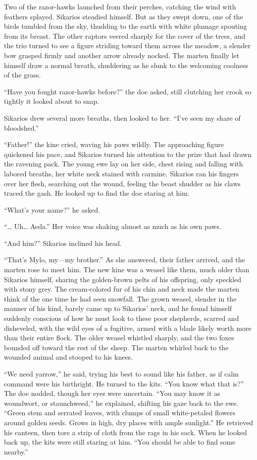 Two of the razor-hawks launched from their perches, catching the wind with feathers splayed. Sikarios steadied himself. But as they swept down, one of the birds tumbled from the sky, thudding to the earth with white plumage spouting from its breast. The other raptors veered sharply for the cover of the trees, and the trio turned to see a figure striding toward them across the meadow, a slender bow grasped firmly and another arrow already nocked. The marten finally let himself draw a normal breath, shuddering as he slunk to the welcoming coolness of the grass.

``Have you fought razor-hawks before?'' the doe asked, still clutching her crook so tightly it looked about to snap.

Sikarios drew several more breaths, then looked to her. ``I've seen my share of bloodshed.''

``Father!'' the kine cried, waving his paws wildly. The approaching figure quickened his pace, and Sikarios turned his attention to the prize that had drawn the ravening pack. The young ewe lay on her side, chest rising and falling with labored breaths, her white neck stained with carmine. Sikarios ran his fingers over her flesh, searching out the wound, feeling the beast shudder as his claws traced the gash. He looked up to find the doe staring at him.

``What's your name?'' he asked.

``\ldots{} Uh\ldots{} Aeda.'' Her voice was shaking almost as much as his own paws.

``And him?'' Sikarios inclined his head.

``That's Mylo, my---my brother.'' As she answered, their father arrived, and the marten rose to meet him. The new kine was a weasel like them, much older than Sikarios himself, sharing the golden-brown pelts of his offspring, only speckled with stony grey. The cream-colored fur of his chin and neck made the marten think of the one time he had seen snowfall. The grown weasel, slender in the manner of his kind, barely came up to Sikarios' neck, and he found himself suddenly conscious of how he must look to these poor shepherds, scarred and disheveled, with the wild eyes of a fugitive, armed with a blade likely worth more than their entire flock. The older weasel whistled sharply, and the two foxes bounded off toward the rest of the sheep. The marten whirled back to the wounded animal and stooped to his knees.

``We need yarrow,'' he said, trying his best to sound like his father, as if calm command were his birthright. He turned to the kits. ``You know what that is?'' The doe nodded, though her eyes were uncertain. ``You may know it as woundwort, or staunchweed,'' he explained, shifting his gaze back to the ewe. ``Green stem and serrated leaves, with clumps of small white-petaled flowers around golden seeds. Grows in high, dry places with ample sunlight.'' He retrieved his canteen, then tore a strip of cloth from the rags in his sack. When he looked back up, the kits were still staring at him. ``You should be able to find some nearby.''

